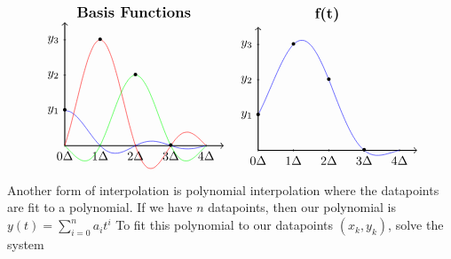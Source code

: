 \documentclass{article}
\begin{document}
\[
    \begin{array}{ccc}
        \begin{tikzpicture}
            \draw[thick,->] (0, 0) -- (4.5,0);
            \draw[thick,->] (0,0) -- (0,3.5);
            \foreach \x in {0,1, 2, 3, 4}
                \draw (\x cm,1pt) -- (\x cm,-1pt) node[anchor=north] {$\x \Delta$};
            \foreach \y in {1,2,3}
                \draw (1pt,\y cm) -- (-1pt,\y cm) node[anchor=east] {$y_{\y}$};
                \draw[scale=1,domain=0.001:4,smooth,variable=\x,blue] plot (\x,{sin((\x r * pi))/(\x * pi)});
                \draw[scale=1,domain=0.001:4,smooth,variable=\x,red] plot (\x,{3*sin(((\x - 1) r * pi))/((\x - 1) * pi)});
                \draw[scale=1,domain=0.001:4,smooth,variable=\x,green] plot (\x,{2*sin(((\x - 2) r * pi))/((\x - 2) * pi)});
            \foreach \Point in {(0,1), (2,2), (1,3), (3, 0)}{
                \node at \Point {\textbullet};
            }
            \node[above,font=\large\bfseries] at (current bounding box.north) {Basis Functions};
        \end{tikzpicture} &
        \begin{tikzpicture}
            \draw[thick,->] (0, 0) -- (4.5,0);
            \draw[thick,->] (0,0) -- (0,3.5);
            \foreach \x in {0,1, 2, 3, 4}
                \draw (\x cm,1pt) -- (\x cm,-1pt) node[anchor=north] {$\x \Delta$};
            \foreach \y in {1,2,3}
                \draw (1pt,\y cm) -- (-1pt,\y cm) node[anchor=east] {$y_{\y}$};
                \draw[scale=1,domain=0.001:4,smooth,variable=\x,blue] plot 
                (\x,{sin((\x r * pi))/(\x * pi) + 3*sin(((\x - 1) r * pi))/((\x - 1) * pi)+2*sin(((\x - 2) r * pi))/((\x - 2) * pi)});
            \foreach \Point in {(0,1), (2,2), (1,3), (3, 0)}{
                \node at \Point {\textbullet};
            }
            \node[above,font=\large\bfseries] at (current bounding box.north) {f(t)};
        \end{tikzpicture}
    \end{array}
\]
Another form of interpolation is polynomial interpolation where the datapoints are fit to a polynomial.
If we have $n$ datapoints, then our polynomial is $y(t) = \sum_{i=0}^{n}{a_i t^i}$
To fit this polynomial to our datapoints $(x_k, y_k)$, solve the system
\end{document}
